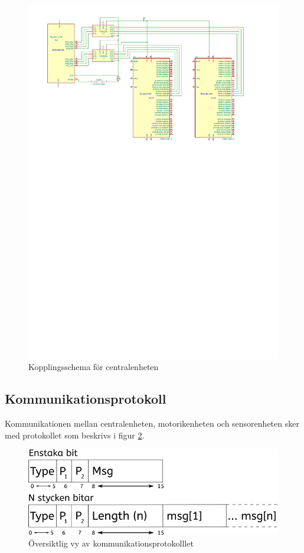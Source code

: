 \documentclass[a4paper,titlepage,12pt]{article}
\begin{document}
	\begin{figure}[htpb]
		\centering
		\includegraphics[width=1.0\linewidth]{charts/central/centralenhet.pdf}
		\caption{Kopplingsschema för centralenheten}
		\label{fig:central_circuit}
	\end{figure}

	\subsection{Kommunikationsprotokoll}
	\label{ssub:Kommunikationsprotokoll}
	Kommunikationen mellan centralenheten, motorikenheten och sensorenheten sker 
	med protokollet som beskrivs i figur \ref{fig:kommunikation1}.

	\newpage
	\begin{figure}[h!]
		\centering
		\includegraphics[width=0.5\linewidth]{images/communication_protocol1.png}
		\caption{Översiktlig vy av kommunikationsprotokolllet}
		\label{fig:kommunikation1}
	\end{figure}
\end{document}

